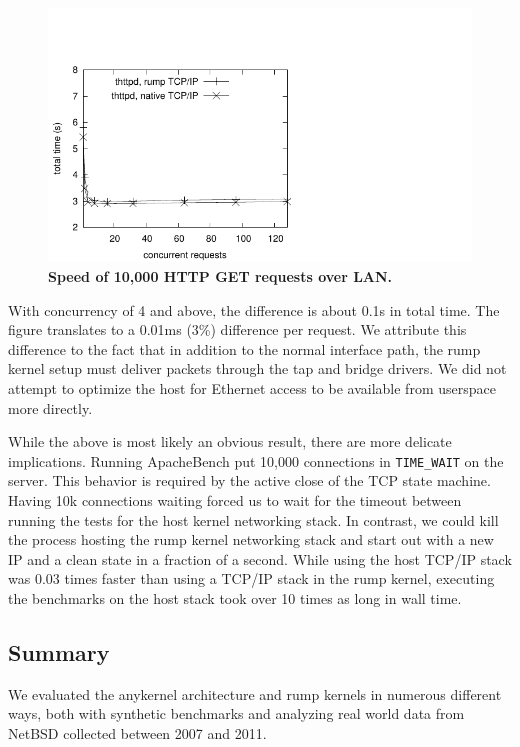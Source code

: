 \begin{figure}
\includegraphics{webspeed.pdf}
\caption[Speed of 10,000 HTTP GET requests over LAN]{
\textbf{Speed of 10,000 HTTP GET requests over LAN.}}
\label{fig:webspeed}
\end{figure}

With concurrency of 4 and above, the difference is about 0.1s in
total time.  The figure translates to a 0.01ms (3\%) difference per request.
We attribute this difference to the fact that in addition to the normal
interface path, the rump kernel setup must deliver packets through the
tap and bridge drivers.  We did not attempt to optimize the host
for Ethernet access to be available from userspace more directly.

While the above is most likely an obvious result, there are more
delicate implications.  Running ApacheBench put 10,000 connections
in \texttt{TIME\_WAIT} on the server.  This behavior is required
by the active close of the TCP state machine.  Having 10k connections
waiting forced us to wait for the timeout between running the tests
for the host kernel networking stack.  In contrast, we could kill
the process hosting the rump kernel networking stack and start out
with a new IP and a clean state in a fraction of a second.  While
using the host TCP/IP stack was 0.03 times faster than using a
TCP/IP stack in the rump kernel, executing the benchmarks on the
host stack took over 10 times as long in wall time.

\subsection{Summary}

We evaluated the anykernel architecture and rump kernels in numerous
different ways, both with synthetic benchmarks and analyzing real
world data from NetBSD collected between 2007 and 2011.

